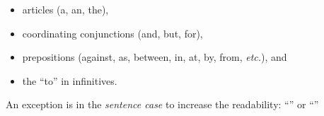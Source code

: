 \documentclass[11pt,a4paper]{article}
\begin{document}
\begin{itemize}
\vspace{-0.25cm}
\begin{itemize}
\item articles (a, an, the),
\item coordinating conjunctions (and, but, for),
\item prepositions (against, as, between, in, at, by, from, \emph{etc.}), and
\item the “to” in infinitives.
\end{itemize}

An exception is in the \emph{sentence case} to increase the readability: ``'' or ``'' 

  
\end{itemize}
\end{document}
